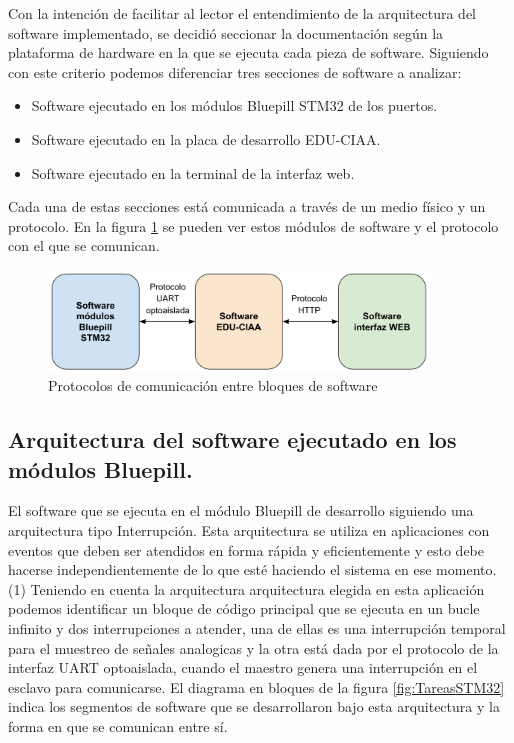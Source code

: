 Con la intención de facilitar al lector el entendimiento de la arquitectura del software implementado, se decidió seccionar la documentación según la plataforma de hardware en la que se ejecuta cada pieza de software. Siguiendo con este criterio podemos diferenciar tres secciones de software a analizar:
\begin{itemize}
	\item Software ejecutado en los módulos Bluepill STM32 de los puertos.
	\item Software ejecutado en la placa de desarrollo EDU-CIAA.
	\item Software ejecutado en la terminal de la interfaz web.
\end{itemize}
	
Cada una de estas secciones está comunicada a través de un medio físico y un protocolo. En la figura \ref{fig:ProtocolosComSoftware} se pueden ver estos módulos de software y el protocolo con el que se comunican.

\begin{figure}[H]
	\centering
	\includegraphics[width=0.9\textwidth]{./Figures/ProtocolosComSoftware.pdf}
	\caption{Protocolos de comunicación entre bloques de software}
	\label{fig:ProtocolosComSoftware}
\end{figure}

\subsection{Arquitectura del software ejecutado en los módulos Bluepill.}

El software que se ejecuta en el módulo Bluepill de desarrollo siguiendo una arquitectura tipo Interrupción. Esta arquitectura se utiliza en aplicaciones con eventos que deben ser atendidos en forma rápida y eficientemente y esto debe hacerse independientemente de lo que esté haciendo el sistema en ese momento.(1)
Teniendo en cuenta la arquitectura arquitectura elegida en esta aplicación podemos identificar un bloque de código principal que se ejecuta en un bucle infinito y dos interrupciones a atender, una de ellas es una interrupción temporal para el muestreo de señales analogicas y la otra está dada por el protocolo de la interfaz UART optoaislada, cuando el maestro genera una interrupción en el esclavo para comunicarse.
El diagrama en bloques de la figura \ref{fig:TareasSTM32} indica los segmentos de software que se desarrollaron bajo esta arquitectura y la forma en que se comunican entre sí.

